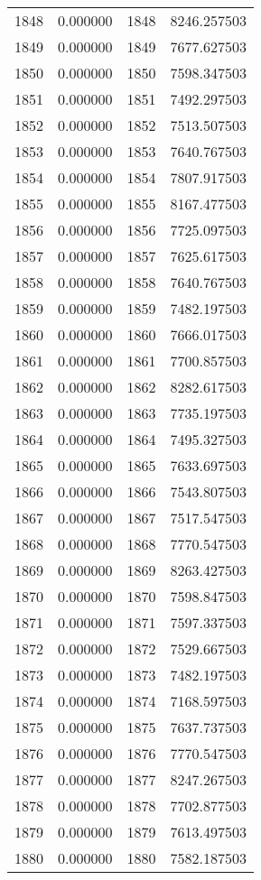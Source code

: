 \documentclass[12pt]{article}
\begin{document}
\begin{longtable}{@{}cccc@{}}
1848 & 0.000000 & 1848 & 8246.257503 \\
1849 & 0.000000 & 1849 & 7677.627503 \\
1850 & 0.000000 & 1850 & 7598.347503 \\
1851 & 0.000000 & 1851 & 7492.297503 \\
1852 & 0.000000 & 1852 & 7513.507503 \\
1853 & 0.000000 & 1853 & 7640.767503 \\
1854 & 0.000000 & 1854 & 7807.917503 \\
1855 & 0.000000 & 1855 & 8167.477503 \\
1856 & 0.000000 & 1856 & 7725.097503 \\
1857 & 0.000000 & 1857 & 7625.617503 \\
1858 & 0.000000 & 1858 & 7640.767503 \\
1859 & 0.000000 & 1859 & 7482.197503 \\
1860 & 0.000000 & 1860 & 7666.017503 \\
1861 & 0.000000 & 1861 & 7700.857503 \\
1862 & 0.000000 & 1862 & 8282.617503 \\
1863 & 0.000000 & 1863 & 7735.197503 \\
1864 & 0.000000 & 1864 & 7495.327503 \\
1865 & 0.000000 & 1865 & 7633.697503 \\
1866 & 0.000000 & 1866 & 7543.807503 \\
1867 & 0.000000 & 1867 & 7517.547503 \\
1868 & 0.000000 & 1868 & 7770.547503 \\
1869 & 0.000000 & 1869 & 8263.427503 \\
1870 & 0.000000 & 1870 & 7598.847503 \\
1871 & 0.000000 & 1871 & 7597.337503 \\
1872 & 0.000000 & 1872 & 7529.667503 \\
1873 & 0.000000 & 1873 & 7482.197503 \\
1874 & 0.000000 & 1874 & 7168.597503 \\
1875 & 0.000000 & 1875 & 7637.737503 \\
1876 & 0.000000 & 1876 & 7770.547503 \\
1877 & 0.000000 & 1877 & 8247.267503 \\
1878 & 0.000000 & 1878 & 7702.877503 \\
1879 & 0.000000 & 1879 & 7613.497503 \\
1880 & 0.000000 & 1880 & 7582.187503 \\

\end{longtable}
\end{document}
